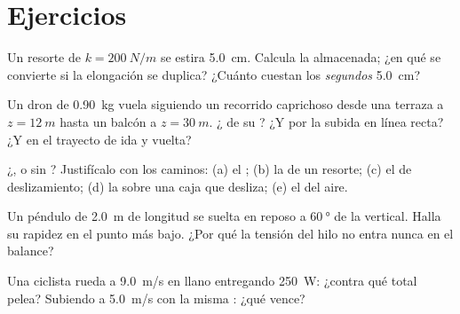\section{Ejercicios}

\begin{exercise}[$\star$]\label{exo:g12:work-and-energy:1}
Un resorte de  $k = \qty{200}{N/m}$ se estira \qty{5.0}{cm}. Calcula
la  almacenada; ¿en qué se convierte si la elongación se duplica? ¿Cuánto
cuestan los \emph{segundos} \qty{5.0}{cm}?
\end{exercise}

\begin{exercise}[$\star$]\label{exo:g12:work-and-energy:2}
Un dron de \qty{0.90}{kg} vuela siguiendo un recorrido caprichoso desde una terraza a
$z = \qty{12}{m}$ hasta un balcón a $z = \qty{30}{m}$. ¿ de su ? ¿Y por la
subida en línea recta? ¿Y en el trayecto de ida y vuelta?
\end{exercise}

\begin{exercise}[$\star$]\label{exo:g12:work-and-energy:3}
¿,  o sin ? Justifícalo con los caminos: (a) el
; (b) la  de un resorte; (c) el  de deslizamiento; (d) la  sobre una caja que desliza; (e) el  del aire.
\end{exercise}

\begin{exercise}[$\star$]\label{exo:g12:work-and-energy:4}
Un péndulo de \qty{2.0}{m} de longitud se suelta en reposo a $\qty{60}{\degree}$ de la
vertical. Halla su rapidez en el punto más bajo. ¿Por qué la tensión del hilo no entra
nunca en el balance?
\end{exercise}

\begin{exercise}[$\star$]\label{exo:g12:work-and-energy:5}
Una ciclista rueda a \qty{9.0}{m/s} en llano entregando \qty{250}{W}: ¿contra qué
  total pelea? Subiendo a \qty{5.0}{m/s} con la misma : ¿qué
 vence?
\end{exercise}

